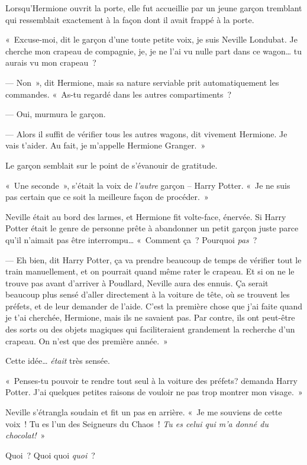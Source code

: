 Lorsqu'Hermione ouvrit la porte, elle fut accueillie par un jeune garçon tremblant qui ressemblait exactement à la façon dont il avait frappé à la porte.

«~Excuse-moi, dit le garçon d'une toute petite voix, je suis Neville Londubat. Je cherche mon crapeau de compagnie, je, je ne l'ai vu nulle part dans ce wagon… tu aurais vu mon crapeau~?

--- Non~», dit Hermione, mais sa nature serviable prit automatiquement les commandes.
«~As-tu regardé dans les autres compartiments~?

--- Oui, murmura le garçon.

--- Alors il suffit de vérifier tous les autres wagons, dit vivement Hermione.
Je vais t'aider.
Au fait, je m'appelle Hermione Granger.~»

Le garçon semblait sur le point de s'évanouir de gratitude.

«~Une seconde~», s'était la voix de \emph{l'autre} garçon -- Harry Potter.
«~Je ne suis pas certain que ce soit la meilleure façon de procéder.~»

Neville était au bord des larmes, et Hermione fit volte-face, énervée.
Si Harry Potter était le genre de personne prête à abandonner un petit garçon juste parce qu'il n'aimait pas être interrompu…
«~Comment ça~? Pourquoi \emph{pas}~?

--- Eh bien, dit Harry Potter, ça va prendre beaucoup de temps de vérifier tout le train manuellement, et on pourrait quand même rater le crapeau.
Et si on ne le trouve pas avant d'arriver à Poudlard, Neville aura des ennuis.
Ça serait beaucoup plus sensé d'aller directement à la voiture de tête, où se trouvent les préfets, et de leur demander de l'aide.
C'est la première chose que j'ai faite quand je t'ai cherchée, Hermione, mais ils ne savaient pas.
Par contre, ils ont peut-être des sorts ou des objets magiques qui faciliteraient grandement la recherche d'un crapeau.
On n'est que des première année.~»

Cette idée… \emph{était} très sensée.

«~Penses-tu pouvoir te rendre tout seul à la voiture des préfets?  demanda Harry Potter.
J'ai quelques petites raisons de vouloir ne pas trop montrer mon visage.~»

Neville s'étrangla soudain et fit un pas en arrière.
«~Je me souviens de cette voix~!
Tu es l'un des Seigneurs du Chaos~!
\emph{Tu es celui qui m'a donné du chocolat!}~»

Quoi~? Quoi quoi \emph{quoi}~?

